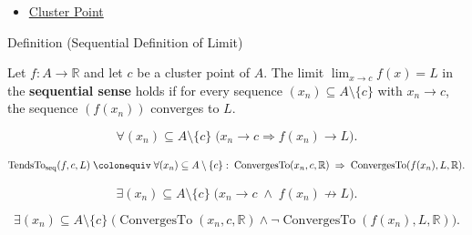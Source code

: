 \begin{dependencies}
\begin{itemize}
  \item \hyperref[def:cluster-point-r]{Cluster Point}
\end{itemize}
\end{dependencies}


\begin{definitionbox}{Definition (Sequential Definition of Limit)}
\begin{definition}
\label{def:limit-function-sequential}
Let $f : A \to \mathbb{R}$ and let $c$ be a cluster point of $A$.
The limit $\lim_{x \to c} f(x) = L$ in the \textbf{sequential
sense} holds if for every sequence $(x_n) \subseteq A \setminus \{c\}$
with $x_n \to c$, the sequence $(f(x_n))$ converges to $L$.
\end{definition}
\end{definitionbox}

\begin{remark*}
\[
  \forall (x_n) \subseteq A \setminus \{c\}\;
  \bigl(x_n \to c \Rightarrow f(x_n) \to L\bigr).
\]
\end{remark*}

\begin{remark*}
\[
  \operatorname{TendsTo}_{\mathrm{seq}}(f, c, L)
  \;\colonequiv\;
  \forall (x_n) \subseteq A \setminus \{c\} :\;
  \operatorname{ConvergesTo}(x_n,c,\mathbb{R})
  \;\Rightarrow\;
  \operatorname{ConvergesTo}(f(x_n),L,\mathbb{R}).
\]
\end{remark*}

\begin{remark*}
\[
  \exists (x_n) \subseteq A \setminus \{c\}\;
  \bigl(x_n \to c \;\wedge\; f(x_n) \not\to L\bigr).
\]
\end{remark*}

\begin{remark*}
\[
  \exists (x_n) \subseteq A \setminus \{c\}\;
  \bigl(\operatorname{ConvergesTo}(x_n,c,\mathbb{R})
  \wedge \neg\operatorname{ConvergesTo}(f(x_n),L,\mathbb{R})\bigr).
\]
\end{remark*}

